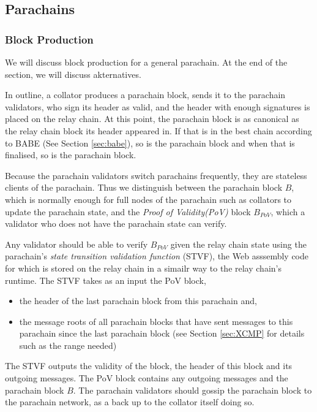 \subsection{Parachains}\label{sec:parachains}

\subsubsection{Block Production}\label{sec:parachainblockproduction}

We will discuss block production for a general parachain. At the end of the section, we will discuss akternatives.

In outline, a collator produces a parachain block, sends it to the parachain validators,
who sign its header as valid, and the header with enough signatures is placed on the relay chain.
At this point, the parachain block is as canonical as the relay chain block its header appeared in.
If that is in the best chain according to BABE (See Section \ref{sec:babe}), so is the parachain block and when that is finalised, so is the parachain block.

Because the parachain validators switch parachains frequently, they are stateless clients of the parachain.
Thus we distinguish between the parachain block $B$, which is normally enough for full nodes of the parachain such as collators to update the parachain state,
and the {\em Proof of Validity(PoV)} block $B_{PoV}$, which a validator who does not have the parachain state can verify.

Any validator should be able to verify $B_{PoV}$ given the relay chain state using the parachain's {\em state transition validation function} (STVF),
the Web asssembly code for which is stored on the relay chain in a simailr way to the relay chain's runtime.
The STVF takes as an input the PoV block,
\begin{itemize}
	\item  the header of the last parachain block from this parachain and,
	\item the message roots of all parachain blocks that have sent messages to this parachain since the last parachain block
	(see Section \ref{sec:XCMP} for details such as the range needed)
\end{itemize}
The STVF outputs the validity of the block, the header of this block and its outgoing messages.
The PoV block contains any outgoing messages and the parachain block $B$. The parachain validators should gossip the parachain block to the parachain network, as a back up to the collator itself doing so.

